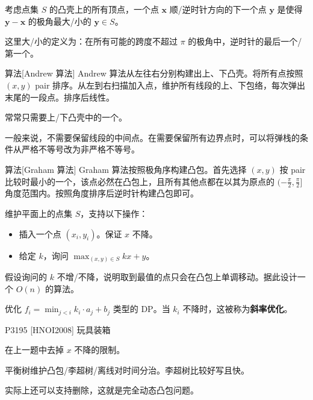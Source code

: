 \begin{lemma}
    考虑点集 $S$ 的凸壳上的所有顶点，一个点 $\mathbf x$ 顺/逆时针方向的下一个点 $\mathbf y$ 是使得 $\mathbf y-\mathbf x$ 的极角最大/小的 $\mathbf{y}\in S$。
\end{lemma}
\begin{remark}
    这里大/小的定义为：在所有可能的跨度不超过 $\pi$ 的极角中，逆时针的最后一个/第一个。
\end{remark}

\begin{descbox}{算法}[Andrew 算法]
    Andrew 算法从左往右分别构建出上、下凸壳。将所有点按照 $(x,y)$ pair 排序。从左到右扫描加入点，维护所有线段的上、下包络，每次弹出末尾的一段点。排序后线性。
\end{descbox}
\begin{remark}
    常常只需要上/下凸壳中的一个。
\end{remark}
\begin{remark}
    一般来说，不需要保留线段的中间点。在需要保留所有边界点时，可以将弹栈的条件从严格不等号改为非严格不等号。
\end{remark}

\begin{descbox}{算法}[Graham 算法]
    Graham 算法按照极角序构建凸包。首先选择 $(x,y)$ 按 pair 比较时最小的一个，该点必然在凸包上，且所有其他点都在以其为原点的 $(-\frac{\pi}{2},\frac{\pi}{2}]$ 角度范围内。按照角度排序后逆时针构建凸包即可。
\end{descbox}

\begin{example}
    维护平面上的点集 $S$，支持以下操作：
    \begin{itemize}
        \item 插入一个点 $(x_i,y_i)$。保证 $x$ 不降。
        \item 给定 $k$，询问 $\max_{(x,y)\in S}kx+y$。
    \end{itemize}
\end{example}
\begin{exercise}
    假设询问的 $k$ 不增/不降，说明取到最值的点只会在凸包上单调移动。据此设计一个 $O(n)$ 的算法。
\end{exercise}
\begin{exercise}
    优化 $f_i=\min_{j<i}k_i\cdot a_j+b_j$ 类型的 DP。当 $k_i$ 不降时，这被称为\textbf{斜率优化}。

    P3195 [HNOI2008] 玩具装箱
\end{exercise}

\begin{example}
    在上一题中去掉 $x$ 不降的限制。
\end{example}
\begin{solution}
    平衡树维护凸包/李超树/离线对时间分治。李超树比较好写且快。
\end{solution}
\begin{remark}
    实际上还可以支持删除，这就是完全动态凸包问题。
\end{remark}

